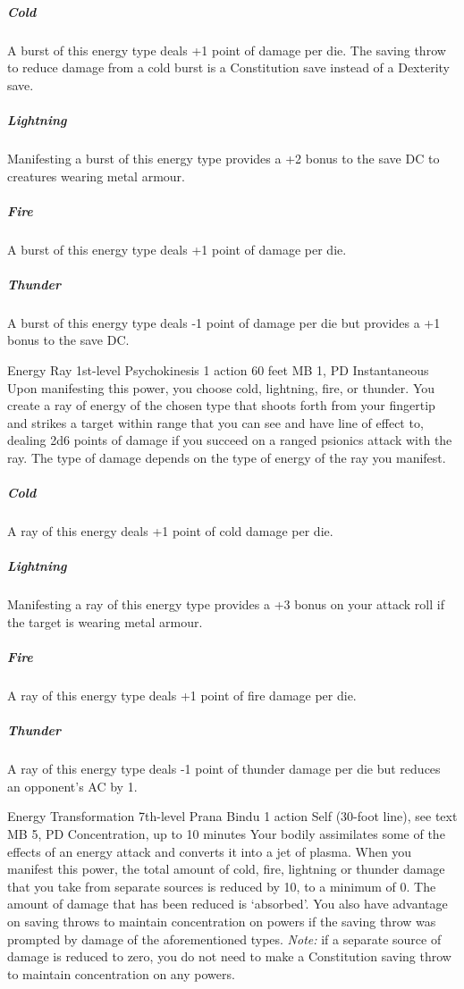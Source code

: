   \subparagraph{Cold}
  A burst of this energy type deals +1 point of damage per die.
  The saving throw to reduce damage from a cold burst
  is a Constitution save instead of a Dexterity save.
  
  \subparagraph{Lightning}
  Manifesting a burst of this energy type provides a +2 bonus
  to the save DC to creatures wearing metal armour.
  
  \subparagraph{Fire}
  A burst of this energy type deals +1 point of damage per die.
  
  \subparagraph{Thunder}
    A burst of this energy type deals -1 point of damage per die
    but provides a +1 bonus to the save DC.

\DndPowerHeader%
  {Energy Ray}
  {1st-level Psychokinesis}
  {1 action}
  {60 feet}
  {MB 1, PD \lvlone}
  {Instantaneous}
Upon manifesting this power,
you choose cold, lightning, fire, or thunder.
You create a ray of energy of the chosen type that
shoots forth from your fingertip and strikes a target within range
that you can see and have line of effect to,
dealing 2d6 points of damage if you succeed on a
ranged psionics attack with the ray.
The type of damage depends on
the type of energy of the ray you manifest. 
  \subparagraph{Cold}
    A ray of this energy deals +1 point of cold damage per die.
  \subparagraph{Lightning}
    Manifesting a ray of this energy type provides a
    +3 bonus on your attack roll if the target is wearing metal armour.
  \subparagraph{Fire}
    A ray of this energy type deals +1 point of fire damage per die.
  \subparagraph{Thunder}
    A ray of this energy type deals -1 point of thunder damage per die
    but reduces an opponent's AC by 1.

\DndPowerHeader%
  {Energy Transformation}
  {7th-level Prana Bindu}
  {1 action}
  {Self (30-foot line), see text}
  {MB 5, PD \lvlseven}
  {Concentration, up to 10 minutes}
  Your bodily assimilates some of the effects of an
  energy attack and converts it into a jet of plasma.
  When you manifest this power,
  the total amount of cold, fire,
  lightning or thunder damage that you take
  from separate sources is reduced by 10,
  to a minimum of 0.
  The amount of damage that has been reduced is `absorbed'.
  You also have advantage on saving throws to
  maintain concentration on powers if the
  saving throw was prompted by damage of the
  aforementioned types.
  \emph{Note:} if a separate source of damage is
  reduced to zero, you do not need to make a Constitution
  saving throw to maintain concentration on any powers.
  
